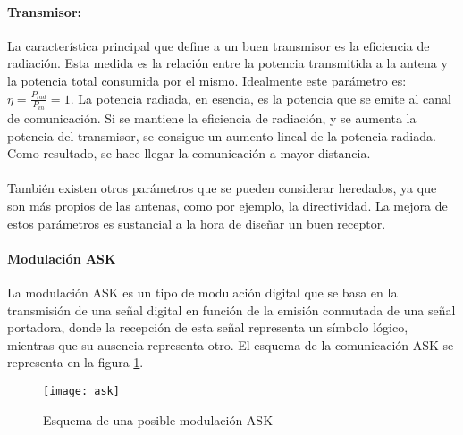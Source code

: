 \paragraph{Transmisor:}La característica principal que define a un buen transmisor es la eficiencia de radiación. Esta medida es la relación entre la potencia transmitida a la antena y la potencia total consumida por el mismo. Idealmente este parámetro es: $\eta = \frac{P_{rad}}{P_{in}} = 1$. La potencia radiada, en esencia, es la potencia que se emite al canal de comunicación. Si se mantiene la eficiencia de radiación, y se aumenta la potencia del transmisor, se consigue un aumento lineal de la potencia radiada. Como resultado, se hace llegar la comunicación a mayor distancia. 
\paragraph{}
También existen otros parámetros que se pueden considerar heredados, ya que son más propios de las antenas, como por ejemplo, la directividad. La mejora de estos parámetros es sustancial a la hora de diseñar un buen receptor.

\paragraph{Modulación ASK}
La modulación ASK es un tipo de modulación digital que se basa en la transmisión de una señal digital en función de la emisión conmutada de una señal portadora, donde la recepción de esta señal representa un símbolo lógico, mientras que su ausencia representa otro.
El esquema de la comunicación ASK se representa en la figura \ref{fig:ask}.

\begin{figure}[h]
    \centering
    \texttt{[image: ask]}
    \caption{Esquema de una posible modulaci\'on ASK}
    \label{fig:ask}
\end{figure}
\paragraph{}
